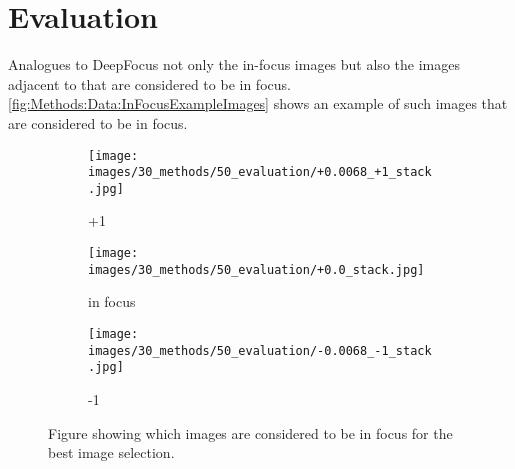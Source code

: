 \section{Evaluation}
\label{sec:Methods:Evaluation}

Analogues to DeepFocus not only the in-focus images but also the images adjacent to that are considered to be in focus. \autoref{fig:Methods:Data:InFocusExampleImages} shows an example of such images that are considered to be in focus.

\begin{figure}[tb]
    \centering
    \begin{subfigure}[t]{0.3\textwidth}
        \centering
        \texttt{[image: images/30\_methods/50\_evaluation/+0.0068\_+1\_stack.jpg]}
        \caption{+1}
    \end{subfigure}
    \begin{subfigure}[t]{0.3\textwidth}
        \centering
        \texttt{[image: images/30\_methods/50\_evaluation/+0.0\_stack.jpg]}
        \caption{in focus}
    \end{subfigure}
    \begin{subfigure}[t]{0.3\textwidth}
        \centering
        \texttt{[image: images/30\_methods/50\_evaluation/-0.0068\_-1\_stack.jpg]}
        \caption{-1}
    \end{subfigure}

    \caption{Figure showing which images are considered to be in focus for the best image selection.}
    \label{fig:Methods:Data:InFocusExampleImages}
\end{figure}
